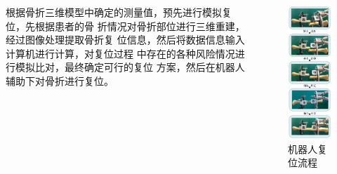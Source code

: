 \documentclass[notheorems, aspectratio=54]{beamer}
\begin{document}
\begin{frame}
\begin{columns}
    根据骨折三维模型中确定的测量值，预先进行模拟复位，先根据患者的骨 折情况对骨折部位进行三维重建，经过图像处理提取骨折复 位信息，然后将数据信息输入计算机进行计算，对复位过程 中存在的各种风险情况进行模拟比对，最终确定可行的复位 方案，然后在机器人辅助下对骨折进行复位。
	\begin{figure}[htbp]
		\centering
		\includegraphics[scale=0.3]{figure6.png}
		\caption{机器人复位流程}
		\label{figure 6}
	\end{figure}
    \end{columns}
\end{frame}
\end{document}
